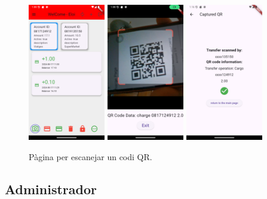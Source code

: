 \documentclass[a4paper,12pt,twoside]{ThesisStyle}
\begin{document}
\begin{figure}[h]
    \centering
    \includegraphics[width=0.3\textwidth]{imatges/mainPage1.png}
    \includegraphics[width=0.3\textwidth]{imatges/scanQR.png}
    \includegraphics[width=0.3\textwidth]{imatges/capturedQR.png}
    \caption{Pàgina per escanejar un codi QR.}
    \label{fig: Pàgina per escanerjar codi QR }
\end{figure}




\subsection{Administrador}
\label{subsec: Admin}
\end{document}
